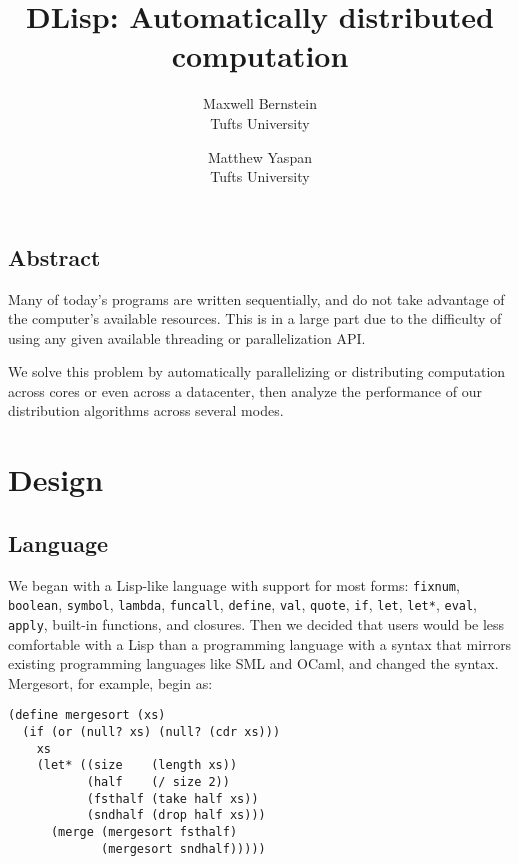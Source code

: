 \documentclass[letterpaper,twocolumn,10pt]{article}
\begin{document}
\date{}

\title{\Large \bf DLisp: Automatically distributed computation}

\newcommand{\tuftsauthor}[1]{{\rm #1}\\
  Tufts University}

\author{
  \tuftsauthor{Maxwell Bernstein}
  \and
  \tuftsauthor{Matthew Yaspan}
}

\maketitle

\subsection*{Abstract}
Many of today's programs are written sequentially, and do not take advantage of
the computer's available resources. This is in a large part due to the
difficulty of using any given available threading or parallelization API.

We solve this problem by automatically parallelizing or distributing
computation across cores or even across a datacenter, then analyze the
performance of our distribution algorithms across several modes.

\section{Design}

\subsection{Language}

We began with a Lisp-like language with support for most forms: \verb|fixnum|,
\verb|boolean|, \verb|symbol|, \verb|lambda|, \verb|funcall|, \verb|define|,
\verb|val|, \verb|quote|, \verb|if|, \verb|let|, \verb|let*|, \verb|eval|,
\verb|apply|, built-in functions, and closures. Then we decided that users
would be less comfortable with a Lisp than a programming language with a syntax
that mirrors existing programming languages like SML and OCaml, and changed the
syntax. Mergesort, for example, begin as:

\begin{verbatim}
(define mergesort (xs)
  (if (or (null? xs) (null? (cdr xs)))
    xs
    (let* ((size    (length xs))
           (half    (/ size 2))
           (fsthalf (take half xs))
           (sndhalf (drop half xs)))
      (merge (mergesort fsthalf)
             (mergesort sndhalf)))))
\end{verbatim}
\end{document}
